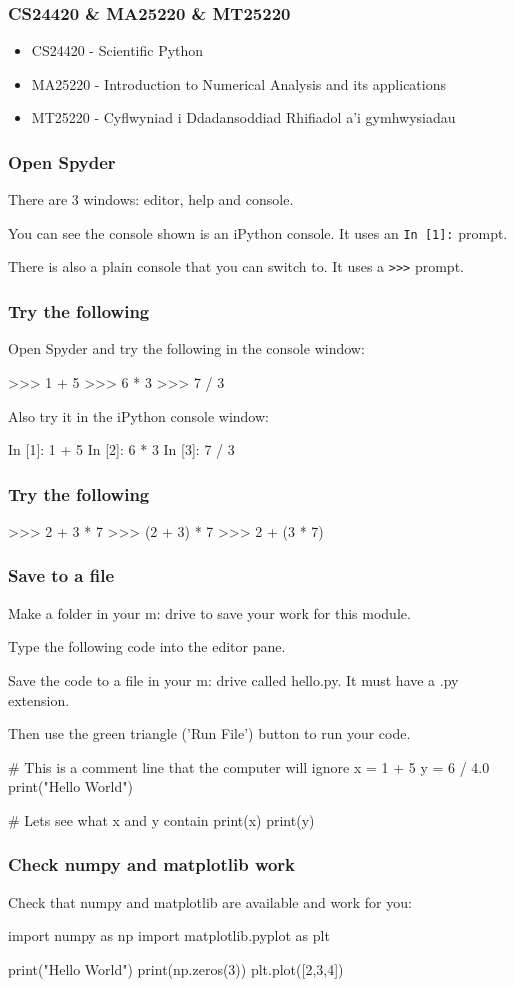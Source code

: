 \documentclass{beamer}
\begin{document}

\begin{frame}
\frametitle{CS24420 \& MA25220 \& MT25220}
\begin{itemize}
\item CS24420 - Scientific Python
\item MA25220 - Introduction to Numerical Analysis and its
  applications
\item MT25220 - Cyflwyniad i Ddadansoddiad Rhifiadol a'i gymhwysiadau
\end{itemize}
\end{frame}

\begin{frame}[fragile]
\frametitle{Open Spyder}
There are 3 windows: editor, help and console.

You can see the console shown is an iPython console. It uses an
\texttt{In [1]:} prompt.

There is also a plain console that you can switch to. It uses a \texttt{>>>} prompt.

\end{frame}


\begin{frame}[fragile]
\frametitle{Try the following}
Open Spyder and try the following in the console window:
\begin{code}
>>> 1 + 5
>>> 6 * 3
>>> 7 / 3
\end{code}

Also try it in the iPython console window:
\begin{code}
In [1]: 1 + 5
In [2]: 6 * 3
In [3]: 7 / 3
\end{code}

\end{frame}



\begin{frame}[fragile]
\frametitle{Try the following}
\begin{code}
>>> 2 + 3 * 7
>>> (2 + 3) * 7
>>> 2 + (3 * 7)
\end{code}
\end{frame}


\begin{frame}[fragile]
\frametitle{Save to a file}
Make a folder in your m: drive to save your work for this module.

Type the following code into the editor pane. 

Save the code to a file in your m: drive called hello.py. It must have
a .py extension. 

Then use the green triangle ('Run File') button to run your code.
\begin{code}
# This is a comment line that the computer will ignore
x = 1 + 5
y = 6 / 4.0
print("Hello World")

# Lets see what x and y contain
print(x)
print(y)
\end{code}
\end{frame}

\begin{frame}[fragile]
\frametitle{Check numpy and matplotlib work}
Check that numpy and matplotlib are available and work for you:
\begin{code}
import numpy as np
import matplotlib.pyplot as plt

print("Hello World")
print(np.zeros(3))
plt.plot([2,3,4]) 
\end{code}
\end{frame}
\end{document}
